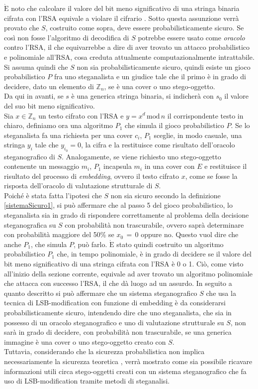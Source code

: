 $\mathrm{\grave{E}}$ noto che calcolare il valore del bit meno significativo di una stringa binaria cifrata con l'RSA equivale a violare il cifrario \cite{sec}. Sotto questa assunzione verrà provato che $S$, costruito come sopra, deve essere probabilisticamente sicuro. Se così non fosse l'algoritmo di decodifica di $S$ potrebbe essere usato come \textit{oracolo} contro l'RSA, il che equivarrebbe a dire di aver trovato un attacco probabilistico e polinomiale all'RSA, cosa creduta attualmente computazionalmente intrattabile.
Si assuma quindi che $S$ non sia probabilisticamente sicuro, quindi esiste un gioco probabilistico $P$ fra uno steganalista e un giudice tale che il primo è in grado di decidere, dato un elemento di $\mathbb{Z}_n$, se è una cover o uno stego-oggetto.\\
Da qui in avanti, se $s$ è una generica stringa binaria, si indicherà con $s_0$ il valore del suo bit meno significativo.\\Sia $x \in \mathbb{Z}_n$ un testo cifrato con l'RSA e $y = x^d \, \mathrm{mod} \, n$ il corrispondente testo in chiaro, definiamo ora una algoritmo $P_1$ che simula il gioco probabilistico $P$. Se lo steganalista fa una richiesta per una cover $c_i$, $P_1$ sceglie, in modo casuale, una stringa $y_i$ tale che $y_{i_0} = 0$, la cifra e la restituisce come risultato dell'oracolo steganografico di $S$. Analogamente, se viene richiesto uno stego-oggetto contenente un messaggio $m_i$, $P_1$ incapsula $m_i$ in una cover con $E$ e restituisce il risultato del processo di \textit{embedding}, ovvero il testo cifrato $x$, come se fosse la risposta dell'oracolo di valutazione strutturale di $S$.\\Poiché è stata fatta l'ipotesi che $S$ non sia sicuro secondo la definizione \ref{sistemaSicuro1}, si può affermare che al passo 5 del gioco probabilistico, lo steganalista sia in grado di rispondere correttamente al problema della decisione steganografica su $S$ con probabilità non trascurabile, ovvero saprà determinare con probabilità maggiore del 50\% se $x_0 \, = \, 0$ oppure no. Questo vuol dire che anche $P_1$, che simula $P$, può farlo. $\mathrm{\grave{E}}$ stato quindi costruito un algoritmo probabilistico $P_1$ che, in tempo polinomiale, è in grado di decidere se il valore del bit meno significativo di una stringa cifrata con l'RSA è 0 o 1. Ciò, come visto all'inizio della sezione corrente, equivale ad aver trovato un algoritmo polinomiale che attacca con successo l'RSA, il che dà luogo ad un assurdo. In seguito a quanto descritto si può affermare che un sistema steganografico $S$ che usa la tecnica di LSB-modification con funzione di embedding è da considerarsi probabilisticamente sicuro, intendendo dire che uno steganalista, che sia in possesso di un oracolo steganografico e uno di valutazione strutturale su $S$, non sarà in grado di decidere, con probabilità non trascurabile, se una generica immagine è una cover o uno stego-oggetto creato con $S$.\\
Tuttavia, considerando che la sicurezza probabilistica non implica necessariamente la sicurezza teoretica \cite{sec}, verrà  mostrato come sia possibile ricavare informazioni utili circa stego-oggetti creati con un sistema steganografico che fa uso di LSB-modification tramite metodi di steganalisi. 